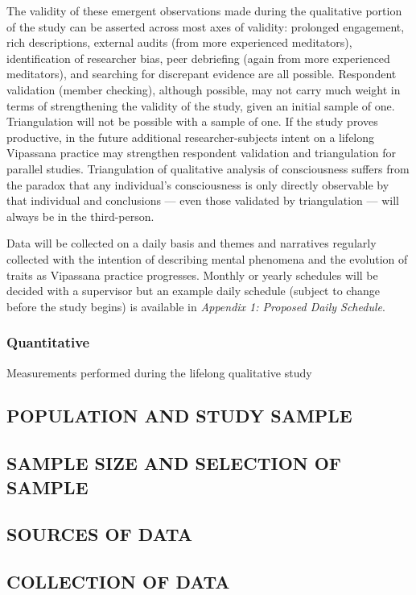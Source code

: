 \documentclass[a4paper, amsfonts, amssymb, amsmath, reprint, showkeys, nofootinbib, twoside]{revtex4-1}
\begin{document}
The validity of these emergent observations made during the qualitative portion of
the study can be asserted across most axes of validity: prolonged engagement, rich
descriptions, external audits (from more experienced meditators), identification of
researcher bias, peer debriefing (again from more experienced meditators), and
searching for discrepant evidence are all possible. Respondent validation (member
checking), although possible, may not carry much weight in terms of strengthening the
validity of the study, given an initial sample of one. Triangulation will not be
possible with a sample of one. If the study proves productive, in the future
additional researcher-subjects intent on a lifelong Vipassana practice may strengthen
respondent validation and triangulation for parallel studies. Triangulation of
qualitative analysis of consciousness suffers from the paradox that any individual's
consciousness is only directly observable by that individual and conclusions --- even
those validated by triangulation --- will always be in the third-person.

Data will be collected on a daily basis and themes and narratives regularly collected
with the intention of
describing mental phenomena and the evolution of traits as Vipassana practice
progresses. Monthly or yearly schedules will be decided with a
supervisor but an example daily schedule (subject to change before the study begins)
is available in \textit{Appendix 1: Proposed Daily Schedule}.

\subsubsection{Quantitative}

Measurements performed during the lifelong qualitative study

\subsection{POPULATION AND STUDY SAMPLE}
\subsection{SAMPLE SIZE AND SELECTION OF SAMPLE}
\subsection{SOURCES OF DATA}
\subsection{COLLECTION OF DATA}
\end{document}
